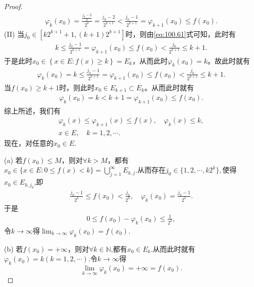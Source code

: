 \documentclass[../../main.tex]{subfiles}%
\begin{document}
\begin{proof}
\begin{align*}
\varphi _k\left( x_0 \right) =\frac{\frac{j_0 - 2}{2}}{2^k}=\frac{j_0 - 2}{2^{k + 1}}<\frac{j_0 - 1}{2^{k + 1}}=\varphi _{k + 1}\left( x_0 \right) \leqslant f\left( x_0 \right).
\end{align*}
(II) 当$j_0\in \left[ k2^{k + 1}+1,(k + 1)2^{k + 1} \right]$时，则由\eqref{eq:100.61}式可知，此时有
\begin{align*}
k\leqslant \frac{j_0 - 1}{2^{k + 1}}=\varphi _{k + 1}\left( x_0 \right) \leqslant f\left( x_0 \right) <\frac{j_0}{2^{k + 1}}\leqslant k + 1.
\end{align*}
于是此时$x_0\in \left\{ x\in E:f\left( x \right) \geqslant k \right\} =E_k$，从而此时$\varphi _k\left( x_0 \right) =k$。故此时就有
\begin{align*}
\varphi _k\left( x_0 \right) =k\leqslant \frac{j_0 - 1}{2^{k + 1}}=\varphi _{k + 1}\left( x_0 \right) \leqslant f\left( x_0 \right) <\frac{j_0}{2^{k + 1}}\leqslant k + 1.
\end{align*}
\two 当$f\left( x_0 \right) \geqslant k + 1$时，则此时$x_0\in E_{k + 1}\subset E_k$。从而此时就有
\begin{align*}
\varphi _k\left( x_0 \right) =k<k + 1=\varphi _{k + 1}\left( x_0 \right) \leqslant f\left( x_0 \right).
\end{align*}
综上所述，我们有 
\begin{gather*}
\varphi_k(x) \leqslant \varphi_{k + 1}(x) \leqslant f(x), \quad \varphi_k(x) \leqslant k, \\
x \in E, \quad k = 1, 2, \cdots.
\end{gather*}
现在，对任意的$x_0 \in E$.

(a) 若$f(x_0) \leqslant M$，则对$\forall k > M$，都有$x_0\in \{x\in E:0\leqslant f(x)<k\}=\bigcup_{j=1}^{\infty}E_{k,j}$.从而存在$j_0\in \{1,2,\cdots,k2^k\},$使得$x_0\in E_{k,j_0}$,即
\begin{align*}
\frac{j_0-1}{2^k}\leqslant f(x_0)<\frac{j_0}{2^k},\quad \varphi_k(x_0)=\frac{j_0-1}{2^k}.
\end{align*}
于是
\begin{align*}
0 \leqslant f(x_0) - \varphi_k(x_0) \leqslant \frac{1}{2^k},
\end{align*}
令$k\to \infty$得$\lim_{k \to \infty} \varphi_k(x_0) = f(x_0).$

(b) 若$f(x_0) = +\infty$，则对$\forall k\in \mathbb{N}$,都有$x_0\in E_k$.从而此时就有$\varphi_k(x_0) = k (k = 1, 2, \cdots).$令$k\to \infty$得$$\lim_{k \to \infty} \varphi_k(x_0) =+\infty = f(x_0).$$


\end{proof}
\end{document}
